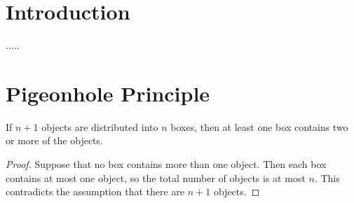 %

\chapter{Introduction}

.....

\chapter{Pigeonhole Principle}

  

\begin{theorem}
  \label{thm:pigeonhole_principle_simple} 
  \leanok
  If $n + 1$ objects are distributed into $n$ boxes, then at least one box contains two or more of the objects.
\end{theorem}

\begin{proof}
  \leanok
  Suppose that no box contains more than one object. Then each box contains at most one object, so the total number of objects is at most $n$. This contradicts the assumption that there are $n + 1$ objects.
\end{proof}
